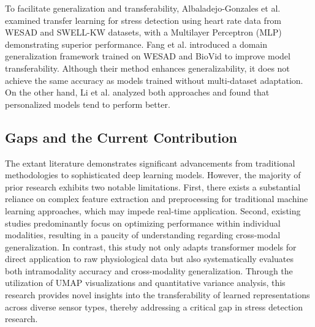 To facilitate generalization and transferability, Albaladejo-Gonzales et al. \cite{albaladejo2023evaluating} examined transfer learning for stress detection using heart rate data from WESAD and SWELL-KW datasets, with a Multilayer Perceptron (MLP) demonstrating superior performance. Fang et al. \cite{fang2022towards} introduced a domain generalization framework trained on WESAD and BioVid to improve model transferability. Although their method enhances generalizability, it does not achieve the same accuracy as models trained without multi-dataset adaptation. On the other hand, Li et al. \cite{li2024comparison} analyzed both approaches and found that personalized models tend to perform better.

\subsection{Gaps and the Current Contribution}

The extant literature demonstrates significant advancements from traditional methodologies to sophisticated deep learning models. However, the majority of prior research exhibits two notable limitations. First, there exists a substantial reliance on complex feature extraction and preprocessing for traditional machine learning approaches, which may impede real-time application. Second, existing studies predominantly focus on optimizing performance within individual modalities, resulting in a paucity of understanding regarding cross-modal generalization. In contrast, this study not only adapts transformer models for direct application to raw physiological data but also systematically evaluates both intramodality accuracy and cross-modality generalization. Through the utilization of UMAP visualizations and quantitative variance analysis, this research provides novel insights into the transferability of learned representations across diverse sensor types, thereby addressing a critical gap in stress detection research.
